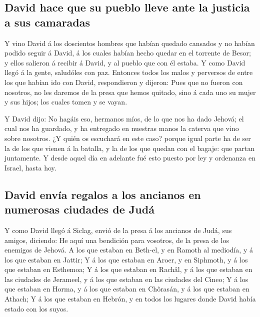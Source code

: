\hypertarget{david-hace-que-su-pueblo-lleve-ante-la-justicia-a-sus-camaradas}{%
\subsection{David hace que su pueblo lleve ante la justicia a sus
camaradas}\label{david-hace-que-su-pueblo-lleve-ante-la-justicia-a-sus-camaradas}}

 Y vino David á los doscientos hombres que habían quedado
cansados y no habían podido seguir á David, á los cuales habían hecho
quedar en el torrente de Besor; y ellos salieron á recibir á David, y al
pueblo que con él estaba. Y como David llegó á la gente, saludóles con
paz.  Entonces todos los malos y perversos de entre los que
habían ido con David, respondieron y dijeron: Pues que no fueron con
nosotros, no les daremos de la presa que hemos quitado, sino á cada uno
su mujer y sus hijos; los cuales tomen y se vayan.

 Y David dijo: No hagáis eso, hermanos míos, de lo que nos
ha dado Jehová; el cual nos ha guardado, y ha entregado en nuestras
manos la caterva que vino sobre nosotros.  ¿Y quién os
escuchará en este caso? porque igual parte ha de ser la de los que
vienen á la batalla, y la de los que quedan con el bagaje: que partan
juntamente.  Y desde aquel día en adelante fué esto puesto
por ley y ordenanza en Israel, hasta hoy.

\hypertarget{david-envuxeda-regalos-a-los-ancianos-en-numerosas-ciudades-de-juduxe1}{%
\subsection{David envía regalos a los ancianos en numerosas ciudades de
Judá}\label{david-envuxeda-regalos-a-los-ancianos-en-numerosas-ciudades-de-juduxe1}}

 Y como David llegó á Siclag, envió de la presa á los
ancianos de Judá, sus amigos, diciendo: He aquí una bendición para
vosotros, de la presa de los enemigos de Jehová.  A los que
estaban en Beth-el, y en Ramoth al mediodía, y á los que estaban en
Jattir;  Y á los que estaban en Aroer, y en Siphmoth, y á
los que estaban en Esthemoa;  Y á los que estaban en
Rachâl, y á los que estaban en las ciudades de Jerameel, y á los que
estaban en las ciudades del Cineo;  Y á los que estaban en
Horma, y á los que estaban en Chôrasán, y á los que estaban en Athach;
 Y á los que estaban en Hebrón, y en todos los lugares
donde David había estado con los suyos.

